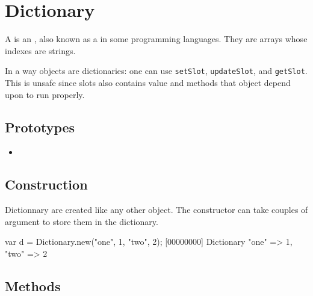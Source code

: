 \section{Dictionary}

A  is an , also known as a
 in some programming languages.  They are arrays whose
indexes are strings.

In a way objects are dictionaries: one can use \lstinline|setSlot|,
\lstinline|updateSlot|, and \lstinline|getSlot|.  This is unsafe since
slots also contains value and methods that object depend upon to run
properly.

\subsection{Prototypes}

\begin{itemize}
\item {}
\end{itemize}

\subsection{Construction}

Dictionnary are created like any other object. The constructor can
take couples of argument to store them in the dictionary.

\begin{urbiscript}
var d = Dictionary.new("one", 1, "two", 2);
[00000000] Dictionary {"one" => 1, "two" => 2}
\end{urbiscript}

\subsection{Methods}

